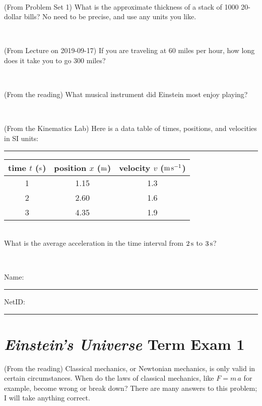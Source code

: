 \documentclass[12pt, letterpaper]{article}
\begin{document}
\vfill ~


\clearpage


\begin{problem} (From Problem Set 1)
What is the approximate thickness of a stack of 1000 20-dollar bills?
No need to be precise, and use any units you like.
\end{problem}


\vfill ~

\begin{problem} (From Lecture on 2019-09-17)
If you are traveling at 60 miles per hour, how long does
it take you to go 300 miles?
\end{problem}


\vfill ~

\begin{problem} (From the reading)
What musical instrument did Einstein most enjoy playing?
\end{problem}


\vfill ~

\begin{problem} (From the Kinematics Lab)
Here is a data table of times, positions, and velocities in SI units:\\
\rule{1.0in}{0pt}\begin{tabular}{c|c|c}
time $t$ ($\mathrm{s}$) & position $x$ ($\mathrm{m}$) & velocity $v$ ($\mathrm{m}\,\mathrm{s}^{-1}$) \\
\hline
1 & 1.15 & 1.3 \\
2 & 2.60 & 1.6 \\
3 & 4.35 & 1.9 \\
\hline
\end{tabular}\\
What is the average acceleration in the time interval from $2\,\mathrm{s}$ to $3\,\mathrm{s}$?
\end{problem}


\vfill ~


\cleardoublepage



\noindent
Name: \rule[-1ex]{0.60\textwidth}{0.1pt}
NetID: \rule[-1ex]{0.20\textwidth}{0.1pt}

\section*{\textsl{Einstein's Universe} Term Exam 1}
\setcounter{problem}{1}


\begin{problem} (From the reading)
Classical mechanics, or Newtonian mechanics, is only valid in certain
circumstances. When do the laws of classical mechanics, like $F =
m\,a$ for example, become wrong or break down? There are many answers
to this problem; I will take anything correct.
\end{problem}
\end{document}

